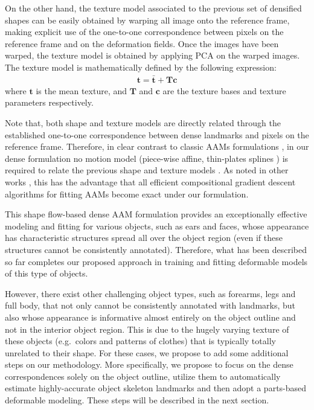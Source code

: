 On the other hand, the texture model associated to the previous set of densified shapes can be easily obtained by warping all image onto the reference frame, making explicit use of the one-to-one correspondence between pixels on the reference frame and on the deformation fields. Once the images have been warped, the texture model is obtained by applying PCA on the warped images. The texture model is mathematically defined by the following expression:
\begin{equation}
    \begin{aligned}
        \bm{t} = \bm{\bar{t}} + \bm{T} \bm{c}
    \end{aligned}
	\label{eq:tex_model}
\end{equation}
where $\bm{t}$ is the mean texture, and $\bm{T}$ and $\bm{c}$ are the texture bases and texture parameters respectively.

Note that, both shape and texture models are directly related through the established one-to-one correspondence between dense landmarks and pixels on the reference frame. Therefore, in clear contrast to classic AAMs formulations \cite{Cootes2001, Matthews2004}, in our dense formulation no motion model (piece-wise affine, thin-plates splines \cite{Bookstein1989}) is required to relate the previous shape and texture models . As noted in other works \cite{Amberg2009, Tzimiropoulos2014}, this has the advantage that all efficient compositional gradient descent algorithms for fitting AAMs \cite{Papandreou2008, Matthews2004, Amberg2009, Tzimiropoulos2013, Alabort2014} become exact under our formulation.

This shape flow-based dense AAM formulation provides an exceptionally effective modeling and fitting for various objects, such as ears and faces, whose appearance has characteristic structures spread all over the object region (even if these structures cannot be consistently annotated). Therefore, what has been described so far completes our proposed approach in training and fitting deformable models of this type of objects.

However, there exist other challenging object types, such as forearms, legs and full body, that not only cannot be consistently annotated with landmarks, but also whose appearance is informative almost entirely on the object outline and not in the interior object region. This is due to the hugely varying texture of these objects (e.g.~colors and patterns of clothes) that is typically totally unrelated to their shape. For these cases, we propose to add some additional steps on our methodology. More specifically, we propose to focus on the dense correspondences solely on the object outline, utilize them to automatically estimate highly-accurate object skeleton landmarks and then adopt a parts-based deformable modeling. These steps will be described in the next section.



